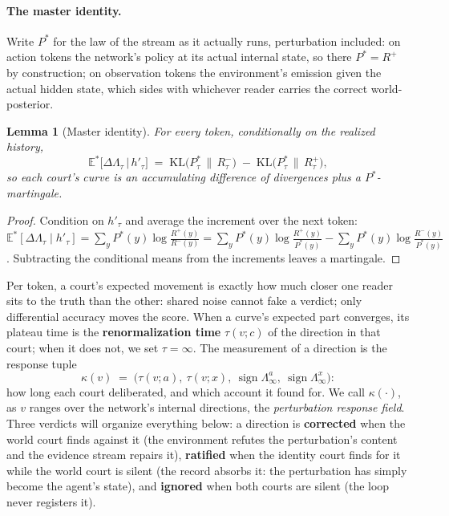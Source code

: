 \documentclass[11pt]{article}
\newtheorem{lemma}{Lemma}
\begin{document}
\paragraph{The master identity.} Write $P^*$ for the law of the stream as it actually runs, perturbation included: on action tokens the network's policy at its actual internal state, so there $P^* = R^{+}$ by construction; on observation tokens the environment's emission given the actual hidden state, which sides with whichever reader carries the correct world-posterior.

\begin{lemma}[Master identity]
\label{lem:master}
For every token, conditionally on the realized history,
\begin{equation}
\tag{M$^*$}\label{eq:master}
\mathbb E^*\big[\Delta\Lambda_\tau \,\big|\, h'_\tau\big] \;=\; \mathrm{KL}\big(P^*_\tau \,\big\|\, R^{-}_\tau\big) \;-\; \mathrm{KL}\big(P^*_\tau \,\big\|\, R^{+}_\tau\big),
\end{equation}
so each court's curve is an accumulating difference of divergences plus a $P^*$-martingale.
\end{lemma}

\begin{proof}
Condition on $h'_\tau$ and average the increment over the next token:
$\mathbb E^*[\Delta\Lambda_\tau \mid h'_\tau] = \sum_y P^*(y) \log\tfrac{R^{+}(y)}{R^{-}(y)} = \sum_y P^*(y)\log\tfrac{R^{+}(y)}{P^*(y)} - \sum_y P^*(y)\log\tfrac{R^{-}(y)}{P^*(y)}$.
Subtracting the conditional means from the increments leaves a martingale.
\end{proof}

Per token, a court's expected movement is exactly how much closer one reader sits to the truth than the other: shared noise cannot fake a verdict; only differential accuracy moves the score. When a curve's expected part converges, its plateau time is the \textbf{renormalization time} $\tau(v; c)$ of the direction in that court; when it does not, we set $\tau = \infty$. The measurement of a direction is the response tuple
\[
\kappa(v) \;=\; \big(\tau(v; a),\ \tau(v; x),\ \operatorname{sign}\Lambda^{a}_\infty,\ \operatorname{sign}\Lambda^{x}_\infty\big):
\]
how long each court deliberated, and which account it found for. We call $\kappa(\cdot)$, as $v$ ranges over the network's internal directions, the \emph{perturbation response field}. Three verdicts will organize everything below: a direction is \textbf{corrected} when the world court finds against it (the environment refutes the perturbation's content and the evidence stream repairs it), \textbf{ratified} when the identity court finds for it while the world court is silent (the record absorbs it: the perturbation has simply become the agent's state), and \textbf{ignored} when both courts are silent (the loop never registers it).
\end{document}
